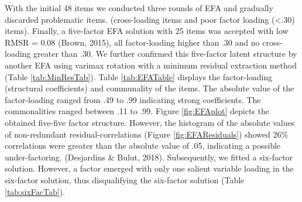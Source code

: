 \documentclass[
  english,
  man]{apa6}
\begin{document}
With the initial 48 items we conducted three rounds of EFA and gradually discarded problematic items. (cross-loading items and poor factor loading (\textless.30) items). Finally, a five-factor EFA solution with 25 items was accepted with low RMSR = 0.08 (Brown, 2015), all factor-loading higher than .30 and no cross-loading greater than .30. We further confirmed this five-factor latent structure by another EFA using varimax rotation with a minimum residual extraction method (Table \ref{tab:MinResTab}). Table \ref{tab:EFATable} displays the factor-loading (structural coefficients) and communality of the items. The absolute value of the factor-loading ranged from .49 to .99 indicating strong coefficients. The commonalities ranged between .11 to .99. Figure \ref{fig:EFAplot} depicts the obtained five-five factor structure. However, the histogram of the absolute values of non-redundant residual-correlations (Figure \ref{fig:EFAResiduals}) showed 26\% correlations were greater than the absolute value of .05, indicating a possible under-factoring. (Desjardins \& Bulut, 2018). Subsequently, we fitted a six-factor solution. However, a factor emerged with only one salient variable loading in the six-factor solution, thus disqualifying the six-factor solution (Table \ref{tab:sixFacTab}).
\end{document}
